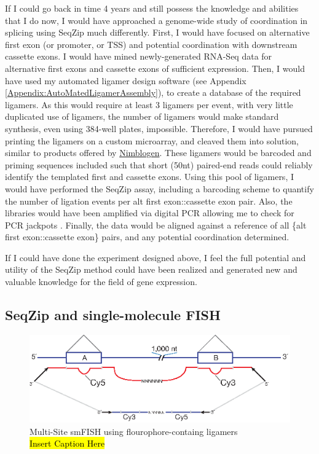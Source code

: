     If I could go back in time 4 years and still possess the knowledge and abilities that I do now, I would have approached a genome-wide study of coordination in splicing using SeqZip much differently. First, I would have focused on alternative first exon (or promoter, or TSS) and potential coordination with downstream cassette exons. I would have mined newly-generated RNA-Seq data \citep{Wang2008, Pan2008} for alternative first exons and cassette exons of sufficient expression. Then, I would have used my automated ligamer design software (see Appendix \ref{Appendix:AutoMatedLigamerAssembly}), to create a database of the required ligamers. As this would require at least 3 ligamers per event, with very little duplicated use of ligamers, the number of ligamers would make standard synthesis, even using 384-well plates, impossible. Therefore, I would have pursued printing the ligamers on a custom microarray, and cleaved them into solution, similar to products offered by \href{http://www.nimblegen.com/}{Nimblogen}. These ligamers would be barcoded and priming sequences included such that short (50nt) paired-end reads could reliably identify the templated first and cassette exons. Using this pool of ligamers, I would have performed the SeqZip assay, including a barcoding scheme to quantify the number of ligation events per {alt first exon::cassette exon} pair. Also, the libraries would have been amplified via digital PCR allowing me to check for PCR jackpots \citep{Shiroguchi2012a}. Finally, the data would be aligned against a reference of all \{alt first exon::cassette exon\} pairs, and any potential coordination determined.

    If I could have done the experiment designed above, I feel the full potential and utility of the SeqZip method could have been realized and generated new and valuable knowledge for the field of gene expression.

  \subsection{SeqZip and single-molecule FISH}\label{Disc:subsec:SeqZip and Single-Molecule FISH}

    \begin{figure} %
      \centering 
      \includegraphics{Figures/Discussion/MultiSiteFish.eps}
      \caption[Multi-Site smFISH using flourophore-containg ligamers]
      {Multi-Site smFISH using flourophore-containg ligamers \\[0.25cm]
        \hl{Insert Caption Here}
        }
      \label{Disc:fig:MultiSite FISH using SeqZip}
      \end{figure}

